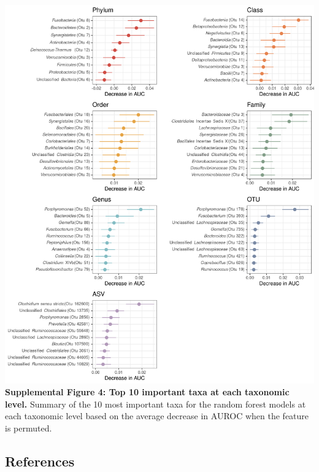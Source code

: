 \documentclass[
]{article}
\begin{document}
\includegraphics[width=\textwidth,height=0.85\textheight]{figure_s4.png}\\
\textbf{Supplemental Figure 4: Top 10 important taxa at each taxonomic
level.} Summary of the 10 most important taxa for the random forest
models at each taxonomic level based on the average decrease in AUROC
when the feature is permuted.

\newpage

\hypertarget{references}{%
\subsection*{References}\label{references}}
\end{document}
